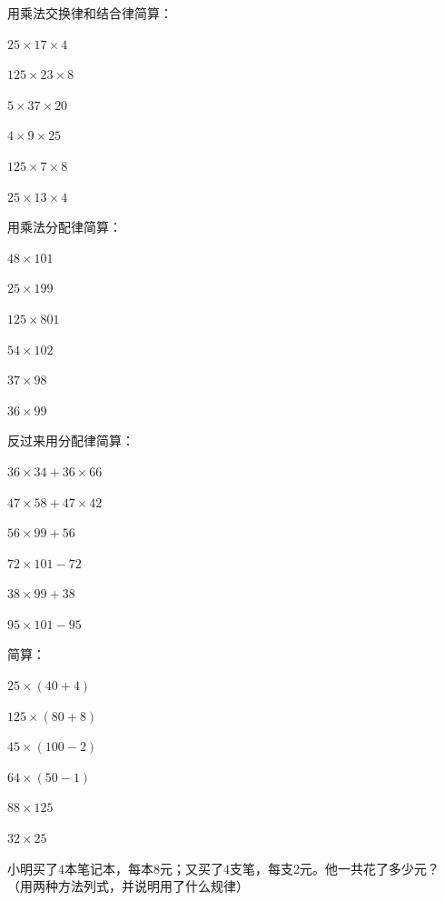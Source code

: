 \begin{exercise}
\item 用乘法交换律和结合律简算：
  \begin{subexercise}
    \item $25\times17\times4$
    \item $125\times23\times8$
    \item $5\times37\times20$
    \item $4\times9\times25$
    \item $125\times7\times8$
    \item $25\times13\times4$
  \end{subexercise}

\item 用乘法分配律简算：
  \begin{subexercise}
    \item $48\times101$
    \item $25\times199$
    \item $125\times801$
    \item $54\times102$
    \item $37\times98$
    \item $36\times99$
  \end{subexercise}

\item 反过来用分配律简算：
  \begin{subexercise}
    \item $36\times34+36\times66$
    \item $47\times58+47\times42$
    \item $56\times99+56$
    \item $72\times101-72$
    \item $38\times99+38$
    \item $95\times101-95$
  \end{subexercise}

\item 简算：
  \begin{subexercise}
    \item $25\times(40+4)$
    \item $125\times(80+8)$
    \item $45\times(100-2)$
    \item $64\times(50-1)$
    \item $88\times125$
    \item $32\times25$
  \end{subexercise}

\item 小明买了4本笔记本，每本8元；又买了4支笔，每支2元。他一共花了多少元？
  （用两种方法列式，并说明用了什么规律）
\end{exercise}

